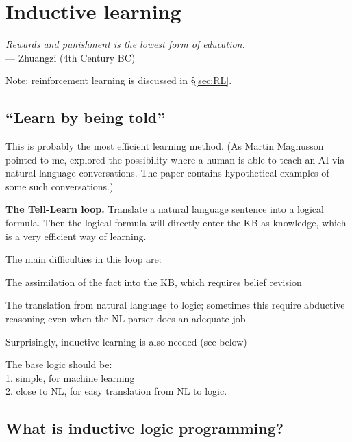 \chapter{Inductive learning}
\label{ch:machine-learning}
\begin{flushright}
\emph{Rewards and punishment is the lowest form of education.}\\
--- Zhuangzi (4th Century BC)
\end{flushright}
\minitoc

Note:  reinforcement learning is discussed in \S\ref{sec:RL}.

\section{``Learn by being told''}
\label{sec:learn-by-being-told}

This is probably the most efficient learning method.  (As Martin Magnusson pointed to me, \citep*{Perlis1996} explored the possibility where a human is able to teach an AI via natural-language conversations.  The paper contains hypothetical examples of some such conversations.)

\textbf{The Tell-Learn loop.}  Translate a natural language sentence into a logical formula.  Then the logical formula will directly enter the KB as knowledge, which is a very efficient way of learning.

The main difficulties in this loop are:
\begin{compactenum}[1.]
\item  The assimilation of the fact into the KB, which requires belief revision
\item  The translation from natural language to logic;  sometimes this require abductive reasoning even when the NL parser does an adequate job
\item  Surprisingly, inductive learning is also needed (see below)\\
\end{compactenum}

The base logic should be:\\
1. simple, for machine learning\\
2. close to NL, for easy translation from NL to logic.

\section{What is inductive logic programming?}
\label{sec:inductive-learner}

